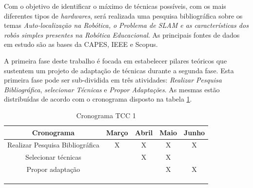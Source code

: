 Com o objetivo de identificar o máximo de técnicas possíveis, com os mais diferentes tipos de \textit{hardwares}, será realizada uma pesquisa bibliográfica sobre os temas \textit{Auto-localização na Robótica, o Problema de SLAM e as características dos robôs simples presentes na Robótica Educacional}. As principais fontes de dados em estudo são as bases da CAPES, IEEE e Scopus.

A primeira fase deste trabalho é focada em estabelecer pilares teóricos que sustentem um projeto de adaptação de técnicas durante a segunda fase. Esta primeira fase pode ser sub-dividida em três atividades: \textit{Realizar Pesquisa Bibliográfica}, \textit{selecionar Técnicas} e \textit{Propor Adaptações}. As mesmas estão distribuídas de acordo com o cronograma disposto na tabela \ref{tab:cronograma}.

\begin{table}[http]
	\centering
	\caption{Cronograma TCC 1}
	\label{tab:cronograma}
	\begin{tabular}{ccccc}
		\hline
		\multicolumn{1}{|c|}{\textbf{Cronograma}}             & \multicolumn{1}{c|}{\textbf{Março}} & \multicolumn{1}{c|}{\textbf{Abril}} & \multicolumn{1}{c|}{\textbf{Maio}} & \multicolumn{1}{c|}{\textbf{Junho}} \\ \hline
		\multicolumn{1}{|c|}{Realizar Pesquisa Bibliográfica} & \multicolumn{1}{c|}{X}              & \multicolumn{1}{c|}{X}              & \multicolumn{1}{c|}{X}             & \multicolumn{1}{c|}{X}              \\ \hline
		\multicolumn{1}{|c|}{Selecionar técnicas}             & \multicolumn{1}{c|}{}               & \multicolumn{1}{c|}{X}              & \multicolumn{1}{c|}{X}             & \multicolumn{1}{c|}{}               \\ \hline
		\multicolumn{1}{|c|}{Propor adaptação}                & \multicolumn{1}{c|}{}               & \multicolumn{1}{c|}{}               & \multicolumn{1}{c|}{X}             & \multicolumn{1}{c|}{X}              \\ \hline
		\multicolumn{1}{l}{}                                  & \multicolumn{1}{l}{}                & \multicolumn{1}{l}{}                & \multicolumn{1}{l}{}               & \multicolumn{1}{l}{}                \\
		\multicolumn{1}{l}{}                                  & \multicolumn{1}{l}{}                & \multicolumn{1}{l}{}                & \multicolumn{1}{l}{}               & \multicolumn{1}{l}{}                \\
		\multicolumn{1}{l}{}                                  & \multicolumn{1}{l}{}                & \multicolumn{1}{l}{}                & \multicolumn{1}{l}{}               & \multicolumn{1}{l}{}               
	\end{tabular}
\end{table}

